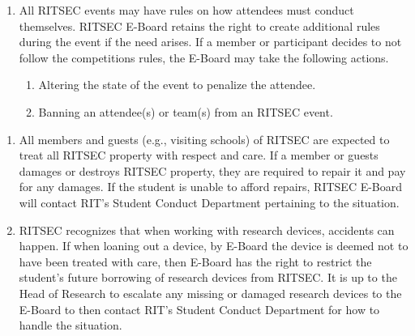 
\begin{enumerate}
      \item All RITSEC events may have rules on how attendees must conduct themselves.
            RITSEC E-Board retains the right to create additional rules during the event if
            the need arises. If a member or participant decides to not follow the
            competitions rules, the E-Board may take the following actions.
            \begin{enumerate}
                  \item Altering the state of the event to penalize the attendee.
                  \item Banning an attendee(s) or team(s) from an RITSEC event. %
            \end{enumerate}
\end{enumerate}


\begin{enumerate}
      \item All members and guests (e.g., visiting schools) of RITSEC are expected to treat
            all RITSEC property with respect and care. If a member or guests damages or
            destroys RITSEC property, they are required to repair it and pay for any
            damages. If the student is unable to afford repairs, RITSEC E-Board will
            contact RIT's Student Conduct Department pertaining to the situation.
      \item RITSEC recognizes that when working with research devices, accidents can happen. If when loaning out a device, by E-Board the device is deemed not to have been treated with care, then E-Board has the right to restrict the student’s future borrowing of research devices from RITSEC. It is up to the Head of Research to escalate any missing or damaged research devices to the E-Board to then contact RIT’s Student Conduct Department for how to handle the situation. 

\end{enumerate}
